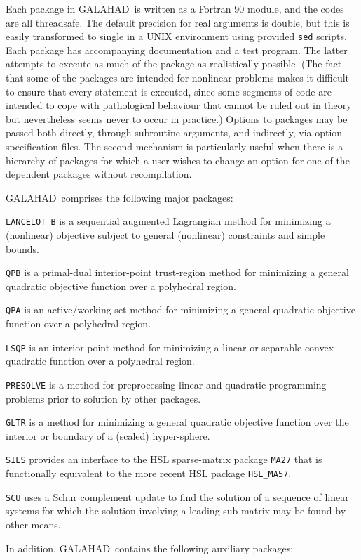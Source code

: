 \documentclass[twoside]{article}
\newcommand{\gal}{{\sf GALAHAD}}
\renewcommand{\itt}[1]{\item{{\tt #1}}}
\begin{document}
Each package in \gal\ is written as a Fortran 90 module, and the codes
are all threadsafe. The default
precision for real arguments is double, but this is easily transformed
to single in a UNIX environment using provided {\tt sed} scripts. 
Each package has accompanying
documentation and a test program. The latter attempts to execute as 
much of the package as
realistically possible. (The fact that some of the packages are
intended for nonlinear problems makes it difficult to ensure that
every statement is executed, since some segments of code are
intended to cope with pathological behaviour that cannot be ruled out
in theory but nevertheless seems never to occur in practice.)
Options to packages may be passed both directly, through subroutine arguments,
and indirectly, via option-specification files. The second mechanism is
particularly useful when there is a hierarchy of packages for which
a user wishes to change an option for one of the dependent packages without
recompilation.


\gal\ comprises the following major packages:

\begin{description}

\itt{LANCELOT B} is a sequential augmented Lagrangian method for 
minimizing a (nonlinear) objective subject to general (nonlinear) constraints
and simple bounds.

\itt{QPB} is a primal-dual interior-point trust-region method for 
minimizing a general quadratic objective function over a polyhedral region.

\itt{QPA} is an active/working-set method for 
minimizing a general quadratic objective function over a polyhedral region.

\itt{LSQP} is an interior-point method for minimizing a linear or 
separable convex quadratic function over a polyhedral region.

\itt{PRESOLVE} is a method for preprocessing linear and quadratic programming 
problems prior to solution by other packages.

\itt{GLTR} is a method for minimizing a general quadratic objective function 
over the interior or boundary of a (scaled) hyper-sphere.

\itt{SILS} provides an interface to the HSL sparse-matrix package {\tt MA27} 
that is functionally equivalent to the more recent HSL package {\tt HSL\_MA57}.

\itt{SCU} uses a Schur complement update to find the solution of 
a sequence of linear systems for which the solution
involving a leading sub-matrix may be found by other means.

\end{description}
In addition, \gal\ contains the following auxiliary packages:
\end{document}
